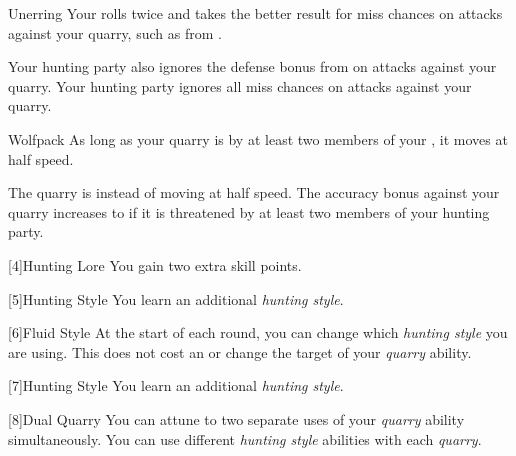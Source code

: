 {            \begin{ability}{Unerring}
                Your  rolls twice and takes the better result for miss chances on attacks against your quarry, such as from .

                \rankline
                 Your hunting party also ignores the defense bonus from  on attacks against your quarry.
                 Your hunting party ignores all miss chances on attacks against your quarry.
            \end{ability}

            \begin{ability}{Wolfpack}
                As long as your quarry is  by at least two members of your , it moves at half speed.

                \rankline
                 The quarry is \immobilized instead of moving at half speed.
                 The accuracy bonus against your quarry increases to  if it is threatened by at least two members of your hunting party.
            \end{ability}
        }

        [4]{Hunting Lore} You gain two extra skill points.

        [5]{Hunting Style}
        You learn an additional \textit{hunting style}.

        [6]{Fluid Style}
        At the start of each round, you can change which \textit{hunting style} you are using.
        This does not cost an  or change the target of your \textit{quarry} ability.

        [7]{Hunting Style}
        You learn an additional \textit{hunting style}.

        [8]{Dual Quarry} You can attune to two separate uses of your \textit{quarry} ability simultaneously.
        You can use different \textit{hunting style} abilities with each \textit{quarry}.

\newpage
